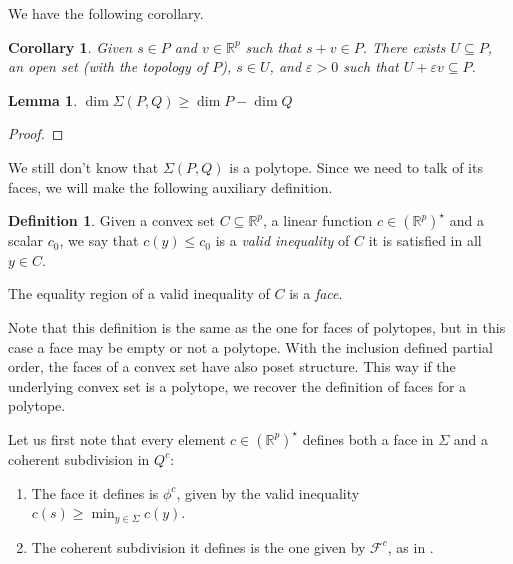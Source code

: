 \documentclass[10pt,a4paper]{article}
\newcommand{\RR}{\mathbb{R}}
\newcommand{\eps}{\varepsilon}
\theoremstyle{plain}
\newtheorem{lemma}{Lemma}
\newtheorem{corollary}{Corollary}
\theoremstyle{remark}
\theoremstyle{definition}
\newtheorem{definition}{Definition}
\begin{document}
    We have the following corollary.
    
    \begin{corollary}
        \label{lem:lemilla}
        Given $s\in  {P}$ and $v\in\RR^p$ such that $s+v\in   P$.
        There exists $U\subseteq   P$, 
        an open set (with the topology of $  P$), $s\in U$,
        and $\eps > 0$ such that $U+\eps v \subseteq   P$.
    \end{corollary}
    
    \begin{lemma} 
        $\dim \Sigma(P,Q) \geq \dim P - \dim Q$
    \end{lemma} 
    \begin{proof}
    \end{proof}
    
    We still don't know that $\Sigma(P,Q)$ is a polytope. 
    Since we need to talk of its faces, we will make the
    following auxiliary definition.
    
    \begin{definition}
        \label{def:notYetKnownToBeFaces}
        Given a convex set $C\subseteq\RR^p$, a linear function $c\in (\RR^p)^\star$ and a scalar $c_0$,
        we say that $c(y) \leq c_0$ is a \emph{valid inequality} of $C$ it is satisfied in all $y\in C$.
        
        The equality region of a valid inequality of $C$ is a \emph{face}.  
    \end{definition}
    Note that this definition is the same as the one for faces of polytopes,
    but in this case a face may be empty or not a polytope.
    With the inclusion defined partial order, 
    the faces of a convex set have also poset structure.
    This way if the underlying convex set is a polytope, we recover the definition of faces for a polytope.
    
    Let us first note that every element $c\in(\RR^p)^\star$ defines
    both a face in $\Sigma$ and a coherent subdivision in $Q^c$:
    \begin{enumerate}
        \item The face it defines is 
        $\phi^c$, given by the valid inequality 
        $c(s) \geq \min_{y\in \Sigma} c(y)$. 
        \item The coherent subdivision it defines is the one given by
        $\mathcal{F}^c$, as in \cite[Def. 9.2]{ziegler2012lectures}.
    \end{enumerate}
    
\end{document}
